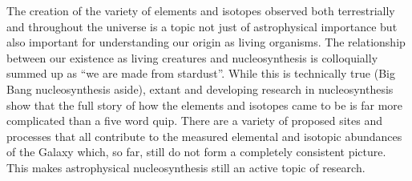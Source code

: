 The creation of the variety of elements and isotopes observed both terrestrially and throughout the universe is a topic not just of astrophysical importance but also important for understanding our origin as living organisms.  The relationship between our existence as living creatures and nucleosynthesis is colloquially summed up as ``we are made from stardust''.  While this is technically true (Big Bang nucleosynthesis aside), extant and developing research in nucleosynthesis show that the full story of how the elements and isotopes came to be is far more complicated than a five word quip.  There are a variety of proposed sites and processes that all contribute to the measured elemental and isotopic abundances of the Galaxy which, so far, still do not form a completely consistent picture.  This makes astrophysical nucleosynthesis still an active topic of research.

